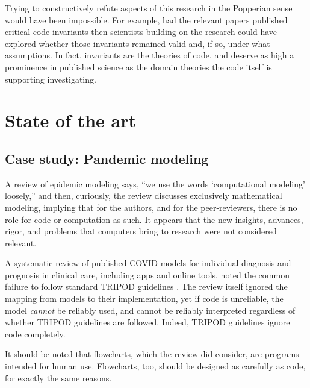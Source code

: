\documentclass{comjnl}
\begin{document}
Trying to constructively refute aspects of this research in the Popperian sense \cite{popper-conjectures-refutations} would have been impossible. For example, had the relevant papers published critical code invariants then scientists building on the research could have explored whether those invariants remained valid and, if so, under what assumptions. In fact, invariants are the theories of code, and deserve as high a prominence in published  science as the domain theories the code itself is supporting investigating. 


\section{State of the art}%

\subsection{Case study: Pandemic modeling}
\label{section-pandemic-modeling}
A review of epidemic modeling \cite{science-review} says, ``we use the words `computational modeling' loosely,'' and then, curiously, the review discusses exclusively mathematical modeling, implying that for the authors, and for the peer-reviewers, there is no role for code or computation as such. It appears that the new insights, advances, rigor, and problems that computers bring to research were not considered relevant. 

A systematic review \cite{diagnosis-reviews} of published COVID models for individual diagnosis and prognosis in clinical care, including apps and online tools, noted the common failure to follow standard TRIPOD guidelines \cite{tripod}. The review \cite{diagnosis-reviews} itself ignored the mapping from models to their implementation, yet if code is unreliable, the model \emph{cannot\/} be reliably used, and cannot be reliably interpreted regardless of whether TRIPOD guidelines are followed. Indeed, TRIPOD guidelines ignore code completely. 

It should be noted that flowcharts, which the review \cite{diagnosis-reviews} did consider, are programs intended for human use. Flowcharts, too, should be designed as carefully as code, for exactly the same reasons. 
\end{document}
